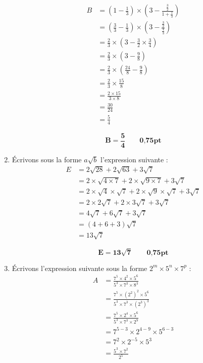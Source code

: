 \documentclass[12pt,a4paper]{article}
\begin{document}
\begin{enumerate}
\[
\begin{aligned}
    B &= \left( 1 - \frac{1}{3} \right) \times \left( 3 - \frac{\frac{3}{2}}{1 + \frac{1}{3}} \right) \\[6pt]
    &= \left( \frac{3}{3} - \frac{1}{3} \right) \times \left( 3 - \frac{\frac{3}{2}}{\frac{4}{3}} \right) \\[6pt]
    &= \frac{2}{3} \times \left( 3 - \frac{3}{2} \times \frac{3}{4} \right) \\[6pt]
    &= \frac{2}{3} \times \left( 3 - \frac{9}{8} \right) \\[6pt]
    &= \frac{2}{3} \times \left( \frac{24}{8} - \frac{9}{8} \right) \\[6pt]
    &= \frac{2}{3} \times \frac{15}{8} \\[6pt]
    &= \frac{2 \times 15}{3 \times 8} \\[6pt]
    &= \frac{30}{24} \\[6pt]
    &= \frac{5}{4}
\end{aligned}
\]

\begin{tcolorbox}[colback=yellow!20, colframe=black, sharp corners]
    \[
    \mathbf{B = \frac{5}{4}}\quad\quad     \textbf{0,75pt}
    \]
\end{tcolorbox}

\item Écrivons sous la forme \( a\sqrt{b} \) l’expression suivante :
\[
\begin{aligned}
    E &= 2\sqrt{28} + 2\sqrt{63} + 3\sqrt{7} \\[6pt]
    &= 2 \times \sqrt{4 \times 7} + 2 \times \sqrt{9 \times 7} + 3\sqrt{7} \\[6pt]
    &= 2 \times \sqrt{4} \times \sqrt{7} + 2 \times \sqrt{9} \times \sqrt{7} + 3\sqrt{7} \\[6pt]
    &= 2 \times 2\sqrt{7} + 2 \times 3\sqrt{7} + 3\sqrt{7} \\[6pt]
    &= 4\sqrt{7} + 6\sqrt{7} + 3\sqrt{7} \\[6pt]
    &= (4 + 6 + 3) \sqrt{7} \\[6pt]
    &= 13\sqrt{7}
\end{aligned}
\]

\begin{tcolorbox}[colback=yellow!20, colframe=black, sharp corners]
    \[
    \mathbf{E = 13\sqrt{7}}\quad\quad     \textbf{0,75pt}
    \]
\end{tcolorbox}
\item Écrivons l’expression suivante sous la forme \( 2^m \times 5^n \times 7^p \) :
\[
\begin{aligned}
    A &= \frac{7^5 \times 4^2 \times 5^6}{5^3 \times 7^3 \times 8^3} \\[6pt]
    &= \frac{7^5 \times (2^2)^2 \times 5^6}{5^3 \times 7^3 \times (2^3)^3} \\[6pt]
    &= \frac{7^5 \times 2^4 \times 5^6}{5^3 \times 7^3 \times 2^9} \\[6pt]
    &= 7^{5-3} \times 2^{4-9} \times 5^{6-3} \\[6pt]
    &= 7^2 \times 2^{-5} \times 5^3 \\[6pt]
    &= \frac{5^3 \times 7^2}{2^5}
\end{aligned}
\]


\end{enumerate}
\end{document}
